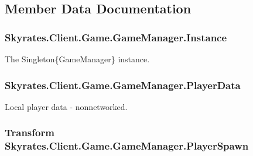 \subsection{Member Data Documentation}
\hypertarget{class_skyrates_1_1_client_1_1_game_1_1_game_manager_accacf771756ee6a41d2c0ced6bf798ca}{
\subsubsection[{Instance}]{ Skyrates.\-Client.\-Game.\-Game\-Manager.\-Instance\hspace{0.3cm}{\ttfamily [static]}}}\label{class_skyrates_1_1_client_1_1_game_1_1_game_manager_accacf771756ee6a41d2c0ced6bf798ca}


The Singleton\{\-Game\-Manager\} instance. 

\hypertarget{class_skyrates_1_1_client_1_1_game_1_1_game_manager_a370a843db6f1bc3d9a3e9a500aad0775}{
\subsubsection[{Player\-Data}]{ Skyrates.\-Client.\-Game.\-Game\-Manager.\-Player\-Data}}\label{class_skyrates_1_1_client_1_1_game_1_1_game_manager_a370a843db6f1bc3d9a3e9a500aad0775}


Local player data -\/ nonnetworked. 

\hypertarget{class_skyrates_1_1_client_1_1_game_1_1_game_manager_ade8d1e4254dfb7141f1365a5751ef987}{
\subsubsection[{Player\-Spawn}]{\setlength{\rightskip}{0pt plus 5cm}Transform Skyrates.\-Client.\-Game.\-Game\-Manager.\-Player\-Spawn}}\label{class_skyrates_1_1_client_1_1_game_1_1_game_manager_ade8d1e4254dfb7141f1365a5751ef987}


